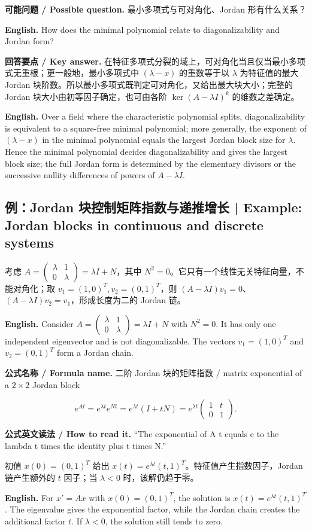 \documentclass[UTF8,11pt,a4paper]{ctexart}
\newcommand{\EN}[1]{\par\noindent\textbf{English.} #1\par}
\newcommand{\READ}[1]{\par\noindent\textbf{公式英文读法 / How to read it.} #1\par}
\newcommand{\FORMULA}[2]{\par\noindent\textbf{公式名称 / Formula name.} #1 / #2\par}
\newcommand{\ASK}[4]{\par\noindent\textbf{可能问题 / Possible question.} #1\par\EN{#2}\noindent\textbf{回答要点 / Key answer.} #3\par\EN{#4}\medskip}
\begin{document}
\ASK{最小多项式与可对角化、Jordan 形有什么关系？}{How does the minimal polynomial relate to diagonalizability and Jordan form?}{在特征多项式分裂的域上，可对角化当且仅当最小多项式无重根；更一般地，最小多项式中 $(\lambda-x)$ 的重数等于以 $\lambda$ 为特征值的最大 Jordan 块阶数。所以最小多项式既判定可对角化，又给出最大块大小；完整的 Jordan 块大小由初等因子确定，也可由各阶 $\ker(A-\lambda I)^k$ 的维数之差确定。}{Over a field where the characteristic polynomial splits, diagonalizability is equivalent to a square-free minimal polynomial; more generally, the exponent of $(\lambda-x)$ in the minimal polynomial equals the largest Jordan block size for $\lambda$. Hence the minimal polynomial decides diagonalizability and gives the largest block size; the full Jordan form is determined by the elementary divisors or the successive nullity differences of powers of $A-\lambda I$.}

\subsection{例：Jordan 块控制矩阵指数与递推增长 | Example: Jordan blocks in continuous and discrete systems}
考虑 $A=\begin{pmatrix}\lambda&1\\0&\lambda\end{pmatrix}=\lambda I+N$，其中 $N^2=0$。它只有一个线性无关特征向量，不能对角化；取 $v_1=(1,0)^T,v_2=(0,1)^T$，则 $(A-\lambda I)v_1=0$、$(A-\lambda I)v_2=v_1$，形成长度为二的 Jordan 链。
\EN{Consider $A=\begin{pmatrix}\lambda&1\\0&\lambda\end{pmatrix}=\lambda I+N$ with $N^2=0$. It has only one independent eigenvector and is not diagonalizable. The vectors $v_1=(1,0)^T$ and $v_2=(0,1)^T$ form a Jordan chain.}
\FORMULA{二阶 Jordan 块的矩阵指数}{matrix exponential of a $2\times2$ Jordan block}
\[
e^{At}=e^{\lambda t}e^{Nt}=e^{\lambda t}(I+tN)
=e^{\lambda t}\begin{pmatrix}1&t\\0&1\end{pmatrix}.
\]
\READ{``The exponential of A t equals e to the lambda t times the identity plus t times N.''}
初值 $x(0)=(0,1)^T$ 给出 $x(t)=e^{\lambda t}(t,1)^T$。特征值产生指数因子，Jordan 链产生额外的 $t$ 因子；当 $\lambda<0$ 时，该解仍趋于零。
\EN{For $x'=Ax$ with $x(0)=(0,1)^T$, the solution is $x(t)=e^{\lambda t}(t,1)^T$. The eigenvalue gives the exponential factor, while the Jordan chain creates the additional factor $t$. If $\lambda<0$, the solution still tends to zero.}
\end{document}
